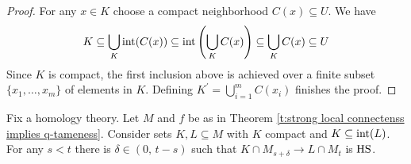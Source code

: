 \begin{proof}
	For any $x \in K$ choose a compact neighborhood $C(x) \subseteq U$.
	We have
	\begin{equation*}
	K \subseteq \bigcup_K \operatorname{int}(C(x)) \subseteq \operatorname{int}\left(\bigcup_K C(x)\right) \subseteq \bigcup_K C(x) \subseteq U
	\end{equation*}
	Since $K$ is compact, the first inclusion above is achieved over a finite subset $\{x_1, \dots, x_m\}$ of elements in $K$.
	Defining $K^\prime = \bigcup_{i=1}^m C(x_i)$ finishes the proof.
\end{proof}

\begin{lem} \label{l:key lemma for q-tameness}
	Fix a homology theory. Let $M$ and $f$ be as in Theorem \ref{t:strong local connectenss implies q-tameness}.
	Consider sets $K, L \subseteq M$ with $K$ compact and $K \subseteq \operatorname{int}(L)$. For any $s < t$ there is $\delta \in (0,\, t-s)$ such that $K \cap M_{s+\delta} \to L \cap M_{t}$ is $\mathrm{HS}$.
\end{lem}

